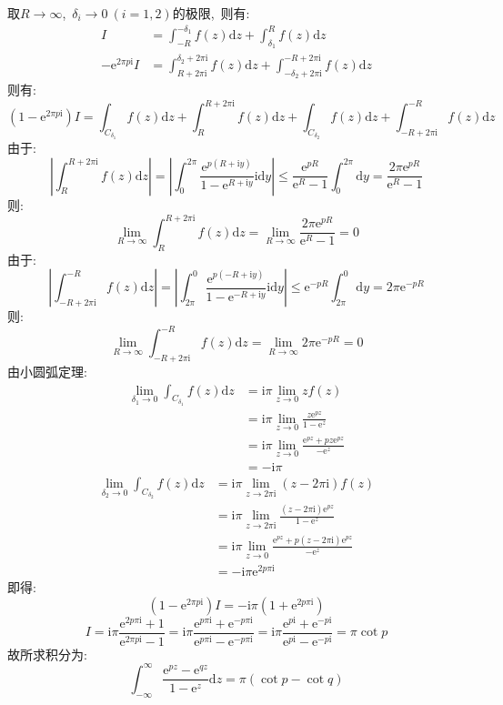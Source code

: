 \documentclass[a4paper,fontset=windows]{ctexart}
\begin{document}
\begin{itemize}
取$R\rightarrow\infty$,\ $\delta_i\rightarrow0\ (i=1,2)$的极限,\ 则有:
\begin{align*}
I
&=\int_{-R}^{-\delta_1}f(z)\mathrm{d}z+\int_{\delta_1}^{R}f(z)\mathrm{d}z \\
-\mathrm{e}^{2\pi p\mathrm{i}}I
&=\int_{R+2\pi\mathrm{i}}^{\delta_2+2\pi\mathrm{i}}f(z)\mathrm{d}z+\int_{-\delta_2+2\pi\mathrm{i}}^{-R+2\pi\mathrm{i}}f(z)\mathrm{d}z
\end{align*}
则有:
\[
(1-\mathrm{e}^{2\pi p\mathrm{i}})I
=\int_{C_{\delta_1}}f(z)\mathrm{d}z+
\int_{R}^{R+2\pi\mathrm{i}}f(z)\mathrm{d}z+
\int_{C_{\delta_2}}f(z)\mathrm{d}z+
\int_{-R+2\pi\mathrm{i}}^{-R}f(z)\mathrm{d}z
\]
由于:
\[
\left|\int_{R}^{R+2\pi\mathrm{i}}f(z)\mathrm{d}z\right| 
=\left|\int_{0}^{2\pi}\frac{\mathrm{e}^{p(R+\mathrm{i}y)}}{1-\mathrm{e}^{R+\mathrm{i}y}}\mathrm{i}\mathrm{d}y\right|
\leqslant\frac{\mathrm{e}^{pR}}{\mathrm{e}^{R}-1}\int_{0}^{2\pi}\mathrm{d}y
=\frac{2\pi\mathrm{e}^{pR}}{\mathrm{e}^{R}-1}
\]
则:
\[
\lim_{R \to \infty}\int_{R}^{R+2\pi\mathrm{i}}f(z)\mathrm{d}z
=\lim_{R \to \infty}\frac{2\pi\mathrm{e}^{pR}}{\mathrm{e}^{R}-1}
=0
\]
由于:
\[
\left|\int_{-R+2\pi\mathrm{i}}^{-R}f(z)\mathrm{d}z\right| 
=\left|\int_{2\pi}^{0}\frac{\mathrm{e}^{p(-R+\mathrm{i}y)}}{1-\mathrm{e}^{-R+\mathrm{i}y}}\mathrm{i}\mathrm{d}y\right|
\leqslant\mathrm{e}^{-pR}\int_{2\pi}^{0}\mathrm{d}y
=2\pi\mathrm{e}^{-pR}
\]
则:
\[
\lim_{R \to \infty}\int_{-R+2\pi\mathrm{i}}^{-R}f(z)\mathrm{d}z
=\lim_{R \to \infty}2\pi\mathrm{e}^{-pR}
=0
\]
由小圆弧定理:
\begin{align*}
\lim_{\delta_1 \to 0}\int_{C_{\delta_1}}f(z)\mathrm{d}z
&=\mathrm{i}\pi\lim_{z \to 0}zf(z) \\
&=\mathrm{i}\pi\lim_{z \to 0}\frac{z\mathrm{e}^{pz}}{1-\mathrm{e}^{z}} \\
&=\mathrm{i}\pi\lim_{z \to 0}\frac{\mathrm{e}^{pz}+pz\mathrm{e}^{pz}}{-\mathrm{e}^{z}} \\
&=-\mathrm{i}\pi
\end{align*}
\begin{align*}
\lim_{\delta_2 \to 0}\int_{C_{\delta_2}}f(z)\mathrm{d}z
&=\mathrm{i}\pi\lim_{z \to 2\pi\mathrm{i}}(z-2\pi\mathrm{i})f(z) \\
&=\mathrm{i}\pi\lim_{z \to 2\pi\mathrm{i}}\frac{(z-2\pi\mathrm{i})\mathrm{e}^{pz}}{1-\mathrm{e}^{z}} \\
&=\mathrm{i}\pi\lim_{z \to 0}\frac{\mathrm{e}^{pz}+p(z-2\pi\mathrm{i})\mathrm{e}^{pz}}{-\mathrm{e}^{z}} \\
&=-\mathrm{i}\pi\mathrm{e}^{2p\pi\mathrm{i}}
\end{align*}
即得:
\[
(1-\mathrm{e}^{2\pi p\mathrm{i}})I
=-\mathrm{i}\pi(1+\mathrm{e}^{2p\pi\mathrm{i}})
\]
\[
I
=\mathrm{i}\pi\frac{\mathrm{e}^{2p\pi\mathrm{i}}+1}{\mathrm{e}^{2\pi p\mathrm{i}}-1}
=\mathrm{i}\pi\frac{\mathrm{e}^{p\pi\mathrm{i}}+\mathrm{e}^{-p\pi\mathrm{i}}}{\mathrm{e}^{p\pi\mathrm{i}}-\mathrm{e}^{-p\pi\mathrm{i}}}
=\mathrm{i}\pi\frac{\mathrm{e}^{p\mathrm{i}}+\mathrm{e}^{-p\mathrm{i}}}{\mathrm{e}^{p\mathrm{i}}-\mathrm{e}^{-p\mathrm{i}}}
=\pi\cot p
\]
故所求积分为:
\[
\int_{-\infty}^{\infty}\frac{\mathrm{e}^{pz}-\mathrm{e}^{qz}}{1-\mathrm{e}^z}\mathrm{d}z
=\pi(\cot p-\cot q)
\]
\end{itemize}
\end{document}
